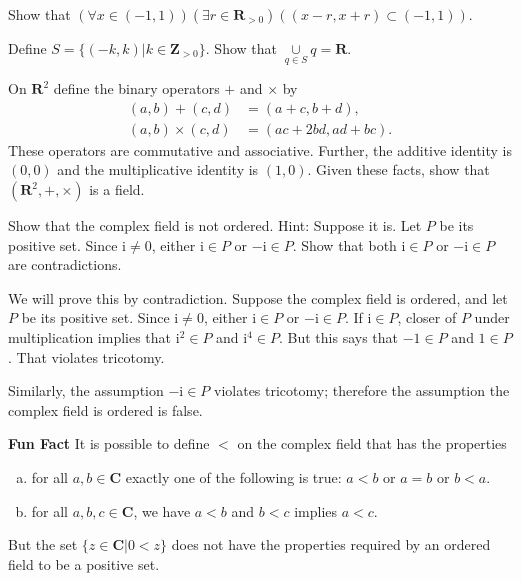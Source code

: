 \documentclass[12pt,fleqn,answers]{exam}
\newenvironment{alphalist}{
  \begin{enumerate}[(a)]
    \addtolength{\itemsep}{0.0\itemsep}}
  {\end{enumerate}}
\newcommand{\reals}{\mathbf{R}}
\newcommand{\complex}{\mathbf{C}}
\newcommand{\integers}{\mathbf{Z}}
\begin{document}
\begin{questions} 

\question[5] Show that
\(
 \left(\forall x \in (-1,1) \right) 
  \left(\exists r \in \reals_{>0} \right)
    \left( (x-r,x+r) \subset (-1,1) \right)
\).

\begin{solution}  
\end{solution}

\question[5] Define $S = \{(-k,k) | k \in \integers_{>0} \}$. Show that
 $\underset{q \in S}{\cup} q = \reals$.
 \begin{solution}  
 \end{solution}

 \question[5] On $\reals^2$ define the binary operators
 $+$ and $\times$ by
\begin{align*}
  (a,b) + (c,d) &= (a+c,b+d),\\
  (a,b) \times (c,d) &= (ac+2bd, ad+bc).
\end{align*}
These operators are commutative and associative. Further, the
additive identity is $(0,0)$ and the multiplicative identity is
$(1,0)$. Given these facts, show that $(\reals^2, +, \times)$ is a 
field.
\begin{solution}  
\end{solution}

\question[5] Show that the complex field is not ordered. Hint: Suppose 
it is. Let $P$ be its positive set. Since $\mathrm{i} \neq 0$, either
$\mathrm{i} \in P$ or $-\mathrm{i} \in P$. Show that both 
$\mathrm{i} \in P$ or $-\mathrm{i} \in P$ are 
contradictions.
\begin{solution}  
  We will prove this by contradiction. Suppose the complex field
  is ordered, and let $P$ be its positive set. Since $\mathrm{i}  \neq 0$,
  either $\mathrm{i} \in P$ or $-\mathrm{i} \in P$. If
  $\mathrm{i} \in P$, closer of $P$ under multiplication implies
  that $\mathrm{i}^2 \in P$ and   $\mathrm{i}^4 \in P$. But this
  says that $-1 \in P$ and $1 \in P$. That violates tricotomy.
  
  \quad Similarly, the assumption $-\mathrm{i} \in P$ violates
  tricotomy;  therefore the assumption the complex field is ordered is false.


  \textbf{Fun Fact} It is possible to define $<$ on the complex field that
  has the properties
  \begin{alphalist}
    \item for all $a,b \in \complex$ exactly one of the following
    is true:  $a<b$ or $a=b$ or $b < a$.
    \item for all $a,b,c \in \complex$, we have $a<b$ and $b < c$ implies
     $a < c$.
  \end{alphalist}
But the set $\{z \in \complex | 0 < z\}$ does not have the properties 
required by an ordered field to be a positive set.

\end{solution}

\end{questions}
\end{document}
